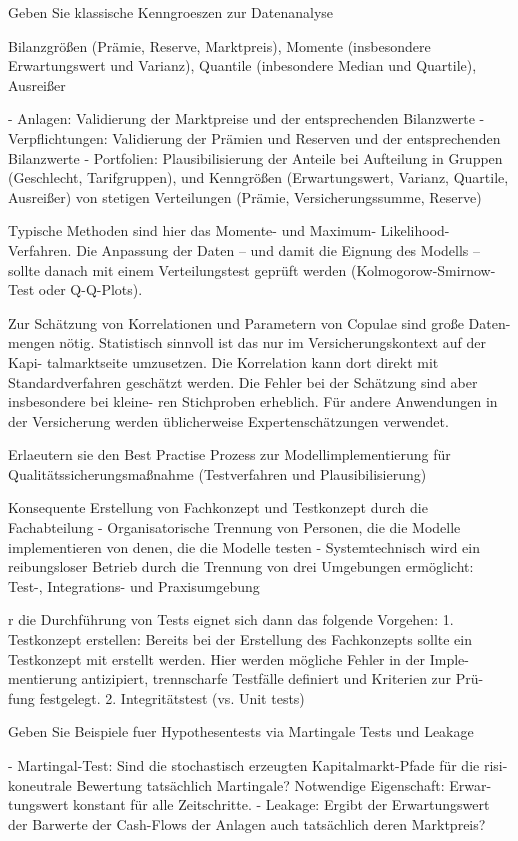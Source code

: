 Geben Sie klassische Kenngroeszen zur Datenanalyse

Bilanzgrößen (Prämie, Reserve, Marktpreis), 
Momente (insbesondere Erwartungswert und Varianz), 
Quantile (inbesondere Median und Quartile), Ausreißer

- Anlagen: Validierung der Marktpreise und der entsprechenden Bilanzwerte
- Verpflichtungen: Validierung der Prämien und Reserven und der entsprechenden Bilanzwerte
- Portfolien: Plausibilisierung der Anteile bei Aufteilung in Gruppen (Geschlecht, Tarifgruppen), und Kenngrößen 
(Erwartungswert, Varianz, Quartile, Ausreißer) von stetigen Verteilungen (Prämie, Versicherungssumme, Reserve)

Typische Methoden sind hier das Momente- und Maximum-
Likelihood-Verfahren. Die Anpassung der Daten – und damit die Eignung des Modells
– sollte danach mit einem Verteilungstest geprüft werden (Kolmogorow-Smirnow-
Test oder Q-Q-Plots).

Zur Schätzung von Korrelationen und Parametern von Copulae sind große Daten-
mengen nötig. Statistisch sinnvoll ist das nur im Versicherungskontext auf der Kapi-
talmarktseite umzusetzen.
Die Korrelation kann dort direkt mit Standardverfahren
geschätzt werden. Die Fehler bei der Schätzung sind aber insbesondere bei kleine-
ren Stichproben erheblich. Für andere Anwendungen in der Versicherung werden
üblicherweise Expertenschätzungen verwendet.


Erlaeutern sie den Best Practise Prozess zur Modellimplementierung für Qualitätssicherungsmaßnahme (Testverfahren und Plausibilisierung)

Konsequente Erstellung von Fachkonzept und Testkonzept durch die Fachabteilung
- Organisatorische Trennung von Personen, die die Modelle implementieren von
denen, die die Modelle testen
- Systemtechnisch wird ein reibungsloser Betrieb durch die Trennung von drei
Umgebungen ermöglicht: Test-, Integrations- und Praxisumgebung

r die Durchführung von Tests eignet sich dann das folgende Vorgehen:
1. Testkonzept erstellen: Bereits bei der Erstellung des Fachkonzepts
sollte ein Testkonzept mit erstellt werden. Hier werden mögliche Fehler in der Imple-
mentierung antizipiert, trennscharfe Testfälle definiert und Kriterien zur Prü-
fung festgelegt.
2. Integritätstest (vs. Unit tests)


Geben Sie Beispiele fuer Hypothesentests via Martingale Tests und Leakage

- Martingal-Test: Sind die stochastisch erzeugten Kapitalmarkt-Pfade für die risi-
koneutrale Bewertung tatsächlich Martingale? Notwendige Eigenschaft: Erwar-
tungswert konstant für alle Zeitschritte.
- Leakage: Ergibt der Erwartungswert der Barwerte der Cash-Flows der Anlagen
auch tatsächlich deren Marktpreis?

